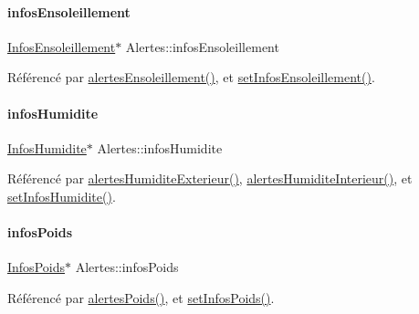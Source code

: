 \paragraph{\texorpdfstring{infos\+Ensoleillement}{infosEnsoleillement}}
{\footnotesize\ttfamily \hyperlink{class_infos_ensoleillement}{Infos\+Ensoleillement}$\ast$ Alertes\+::infos\+Ensoleillement\hspace{0.3cm}{\ttfamily [private]}}



Référencé par \hyperlink{class_alertes_ae7ad960c530a6a7e82df3ed55d159a68}{alertes\+Ensoleillement()}, et \hyperlink{class_alertes_a5379fc65522a77dc2cc110e489e1469d}{set\+Infos\+Ensoleillement()}.

\mbox{\label{class_alertes_a7b6d798ca0629b474120cd55eb8b510c}} 
\paragraph{\texorpdfstring{infos\+Humidite}{infosHumidite}}
{\footnotesize\ttfamily \hyperlink{class_infos_humidite}{Infos\+Humidite}$\ast$ Alertes\+::infos\+Humidite\hspace{0.3cm}{\ttfamily [private]}}



Référencé par \hyperlink{class_alertes_a8606946eaa04dfd29bb7951b2b850a04}{alertes\+Humidite\+Exterieur()}, \hyperlink{class_alertes_a7558cb097dc392547ceb12ab4d6cbd4c}{alertes\+Humidite\+Interieur()}, et \hyperlink{class_alertes_a05734ac9e97a9001de4ce9ef96235c87}{set\+Infos\+Humidite()}.

\mbox{\label{class_alertes_add699ea1cebadb371f86b4c47ebe381d}} 
\paragraph{\texorpdfstring{infos\+Poids}{infosPoids}}
{\footnotesize\ttfamily \hyperlink{class_infos_poids}{Infos\+Poids}$\ast$ Alertes\+::infos\+Poids\hspace{0.3cm}{\ttfamily [private]}}



Référencé par \hyperlink{class_alertes_ac4b8925cc6c262cf7254b1576ba07d33}{alertes\+Poids()}, et \hyperlink{class_alertes_a100bad47769994abc976419a355c4a26}{set\+Infos\+Poids()}.


